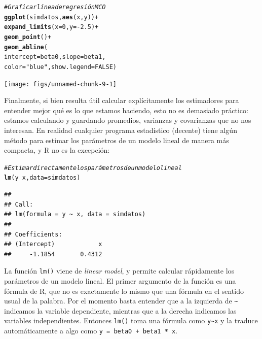 \documentclass[12pt]{report}\usepackage[]{graphicx}\usepackage[]{color}
\makeatletter
\newcommand{\hlnum}[1]{\textcolor[rgb]{0.686,0.059,0.569}{#1}}%
\newcommand{\hlstr}[1]{\textcolor[rgb]{0.192,0.494,0.8}{#1}}%
\newcommand{\hlcom}[1]{\textcolor[rgb]{0.678,0.584,0.686}{\textit{#1}}}%
\newcommand{\hlopt}[1]{\textcolor[rgb]{0,0,0}{#1}}%
\newcommand{\hlstd}[1]{\textcolor[rgb]{0.345,0.345,0.345}{#1}}%
\newcommand{\hlkwc}[1]{\textcolor[rgb]{0.333,0.667,0.333}{#1}}%
\newcommand{\hlkwd}[1]{\textcolor[rgb]{0.737,0.353,0.396}{\textbf{#1}}}%
\newenvironment{kframe}{%
 \def\at@end@of@kframe{}%
 \ifinner\ifhmode%
  \def\at@end@of@kframe{\end{minipage}}%
  \begin{minipage}{\columnwidth}%
 \fi\fi%
 \def\FrameCommand##1{\hskip\@totalleftmargin \hskip-\fboxsep
 \colorbox{shadecolor}{##1}\hskip-\fboxsep
     \hskip-\linewidth \hskip-\@totalleftmargin \hskip\columnwidth}%
 \MakeFramed {\advance\hsize-\width
   \@totalleftmargin\z@ \linewidth\hsize
   \@setminipage}}%
 {\par\unskip\endMakeFramed%
 \at@end@of@kframe}
\newenvironment{knitrout}{}{} %
\newcommand*{\eng}[1]{\textsl{#1}}
\makeatother
\begin{document}
\begin{knitrout}
\color{fgcolor}\begin{kframe}
\begin{alltt}
\hlcom{# Graficar línea de regresión MCO}
\hlkwd{ggplot}\hlstd{(simdatos,} \hlkwd{aes}\hlstd{(x,y))} \hlopt{+}
  \hlkwd{expand_limits}\hlstd{(}\hlkwc{x} \hlstd{=} \hlnum{0}\hlstd{,} \hlkwc{y} \hlstd{=} \hlopt{-}\hlnum{2.5}\hlstd{)} \hlopt{+}
  \hlkwd{geom_point}\hlstd{()} \hlopt{+}
  \hlkwd{geom_abline}\hlstd{(}
    \hlkwc{intercept} \hlstd{= beta0,} \hlkwc{slope} \hlstd{= beta1,}
    \hlkwc{color} \hlstd{=} \hlstr{"blue"}\hlstd{,} \hlkwc{show.legend} \hlstd{=} \hlnum{FALSE} \hlstd{)}
\end{alltt}
\end{kframe}

{\centering \texttt{[image: figs/unnamed-chunk-9-1]} 

}



\end{knitrout}

Finalmente, si bien resulta útil calcular explícitamente los estimadores para entender mejor qué es lo que estamos haciendo, esto no es demasiado práctico: estamos calculando y guardando promedios, varianzas y covarianzas que no nos interesan.
En realidad cualquier programa estadístico (decente) tiene algún método para estimar los parámetros de un modelo lineal de manera más compacta, y R no es la excepción:

\begin{knitrout}
\color{fgcolor}\begin{kframe}
\begin{alltt}
\hlcom{# Estimar directamente los parámetros de un modelo lineal}
\hlkwd{lm}\hlstd{(y} \hlopt{~} \hlstd{x,} \hlkwc{data} \hlstd{= simdatos)}
\end{alltt}
\begin{verbatim}
## 
## Call:
## lm(formula = y ~ x, data = simdatos)
## 
## Coefficients:
## (Intercept)            x  
##     -1.1854       0.4312
\end{verbatim}
\end{kframe}
\end{knitrout}

\begin{Rbox}
La función \verb|lm()| viene de \eng{linear model}, y permite calcular rápidamente los parámetros de un modelo lineal. El primer argumento de la función es una fórmula de R, que no es exactamente lo mismo que una fórmula en el sentido usual de la palabra. Por el momento basta entender que a la izquierda de \verb|~| indicamos la variable dependiente, mientras que a la derecha indicamos las variables independientes. Entonces \verb|lm()| toma una fórmula como \verb|y~x| y la traduce automáticamente a algo como \verb|y = beta0 + beta1 * x|.
\end{Rbox}
\end{document}
